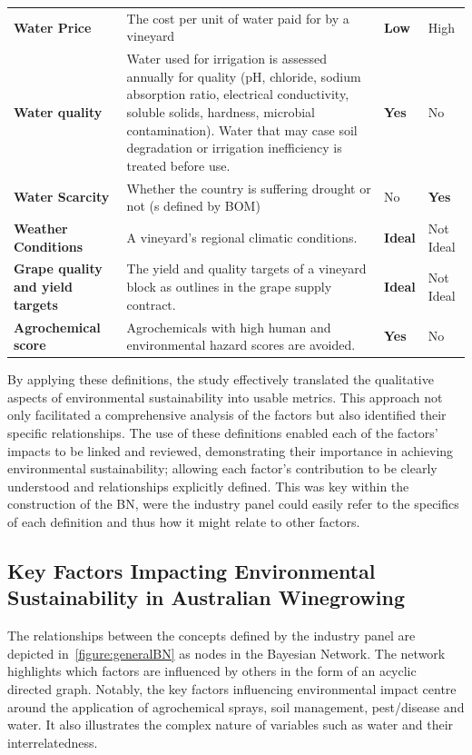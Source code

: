 \begin{table}[h]
\begin{tabular}{@{}llll@{}}
    \textbf{Water Price} & The cost per unit of water paid for by a vineyard & \textbf{Low} & High \\
    \textbf{Water quality} & Water used for irrigation is assessed annually for quality (pH, chloride, sodium absorption ratio, electrical conductivity, soluble solids, hardness, microbial contamination). Water that may case soil degradation or irrigation inefficiency is treated before use. & \textbf{Yes} & No \\
    \textbf{Water Scarcity} & Whether the country is suffering drought or not (s defined by BOM) & No & \textbf{Yes} \\
    \textbf{Weather Conditions} & A vineyard’s regional climatic conditions. & \textbf{Ideal} & Not Ideal \\
    \textbf{Grape quality and yield targets} & The yield and quality targets of a vineyard block as outlines in the grape supply contract. & \textbf{Ideal} & Not Ideal \\
    \textbf{Agrochemical score} & Agrochemicals with high human and environmental hazard scores are avoided. & \textbf{Yes} & No \\ \bottomrule
    \end{tabular}
\end{table}

By applying these definitions, the study effectively translated the qualitative aspects of environmental sustainability into usable metrics. This approach not only facilitated a comprehensive analysis of the factors but also identified their specific relationships. The use of these definitions enabled each of the factors' impacts to be linked and reviewed, demonstrating their importance in achieving environmental sustainability; allowing each factor's contribution to be clearly understood and relationships explicitly defined. This was key within the construction of the BN, were the industry panel could easily refer to the specifics of each definition and thus how it might relate to other factors.

\subsection{Key Factors Impacting Environmental Sustainability in Australian Winegrowing}

The relationships between the concepts defined by the industry panel are depicted in~\ref{figure:generalBN} as nodes in the Bayesian Network. The network highlights which factors are influenced by others in the form of an acyclic directed graph. Notably, the key factors influencing environmental impact centre around the application of agrochemical sprays, soil management, pest/disease and water. It also illustrates the complex nature of variables such as water and their interrelatedness.

